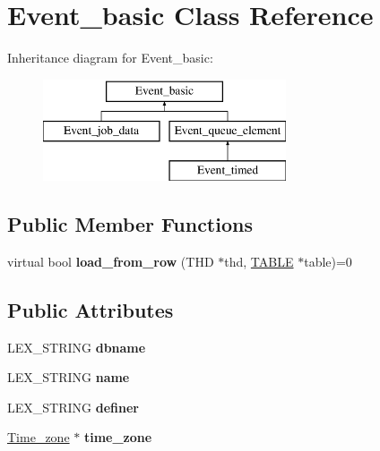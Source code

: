 \hypertarget{classEvent__basic}{}\section{Event\+\_\+basic Class Reference}
\label{classEvent__basic}
Inheritance diagram for Event\+\_\+basic\+:\begin{figure}[H]
\begin{center}
\leavevmode
\includegraphics[height=3.000000cm]{classEvent__basic}
\end{center}
\end{figure}
\subsection*{Public Member Functions}
\begin{DoxyCompactItemize}
\item 
\mbox{\label{classEvent__basic_a67b13b7b8f7028f378291646e57593da}} 
virtual bool {\bfseries load\+\_\+from\+\_\+row} (T\+HD $\ast$thd, \mbox{\hyperlink{structTABLE}{T\+A\+B\+LE}} $\ast$table)=0
\end{DoxyCompactItemize}
\subsection*{Public Attributes}
\begin{DoxyCompactItemize}
\item 
\mbox{\label{classEvent__basic_a10c267d793f3f28014dea748c51cc6ee}} 
L\+E\+X\+\_\+\+S\+T\+R\+I\+NG {\bfseries dbname}
\item 
\mbox{\label{classEvent__basic_a612be6909a6e5e050f988509fdcc031c}} 
L\+E\+X\+\_\+\+S\+T\+R\+I\+NG {\bfseries name}
\item 
\mbox{\label{classEvent__basic_ac21bcb30b2f656159f7ed804671d6275}} 
L\+E\+X\+\_\+\+S\+T\+R\+I\+NG {\bfseries definer}
\item 
\mbox{\label{classEvent__basic_a552650e0088e4378782c661e5e65c82b}} 
\mbox{\hyperlink{classTime__zone}{Time\+\_\+zone}} $\ast$ {\bfseries time\+\_\+zone}
\end{DoxyCompactItemize}
